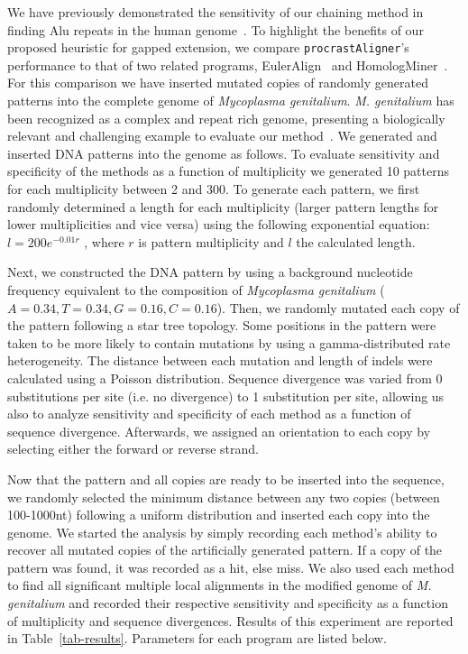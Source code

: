 \documentclass[twoside,11pt]{article}
\begin{document}
We have previously demonstrated the sensitivity of our chaining method in finding Alu repeats in
the human genome~\cite{ref-procrast}. To highlight the benefits of our proposed heuristic for gapped extension, we compare \texttt{procrastAligner}'s performance to that of two related programs, EulerAlign~\cite{ref-related1} and HomologMiner~\cite{ref-homologminer}. For this comparison we have inserted mutated copies of randomly generated patterns into the complete genome of \emph{Mycoplasma genitalium}. \emph{M. genitalium} has been recognized as a complex and repeat rich genome, presenting a biologically relevant and challenging example to evaluate our method~\cite{ref-mycoplasma}. We generated and inserted DNA patterns into the genome as follows. To evaluate sensitivity and specificity of the methods as a function of multiplicity we generated 10 patterns for each multiplicity between 2 and 300. To generate each pattern, we first randomly determined a length for each multiplicity (larger pattern lengths for lower multiplicities and vice versa) using the following exponential equation: $l = 200e^{-0.01r}$ , where $r$ is pattern multiplicity and $l$ the calculated length.

Next, we constructed the DNA pattern by using a background nucleotide frequency equivalent to the composition of \emph{Mycoplasma genitalium} ($A=0.34,T=0.34,G=0.16,C=0.16$). Then, we randomly mutated each copy of the pattern following a star tree topology. Some positions in the pattern were taken to be more likely to contain mutations by using a gamma-distributed rate heterogeneity. The distance between each mutation and length of indels were calculated using a Poisson distribution. Sequence divergence was varied from 0 substitutions per site (i.e. no divergence) to 1 substitution per site, allowing us also to analyze sensitivity and specificity of each method as a function of sequence divergence. Afterwards, we assigned an orientation to each copy by selecting either the forward or reverse strand.

Now that the pattern and all copies are ready to be inserted into the sequence, we randomly selected the minimum distance between any two copies (between 100-1000nt) following a uniform distribution and inserted each copy into the genome.  We started the analysis by simply recording each method's ability to recover all mutated copies of the  artificially generated pattern. If a copy of the pattern was found, it was recorded as a hit, else miss. We also used each method to find all significant multiple local alignments in the modified genome of \emph{M. genitalium} and recorded their respective sensitivity and specificity as a function of multiplicity and sequence divergences. Results of this experiment are reported in Table~\ref{tab-results}. Parameters for each program are listed below.
\end{document}

